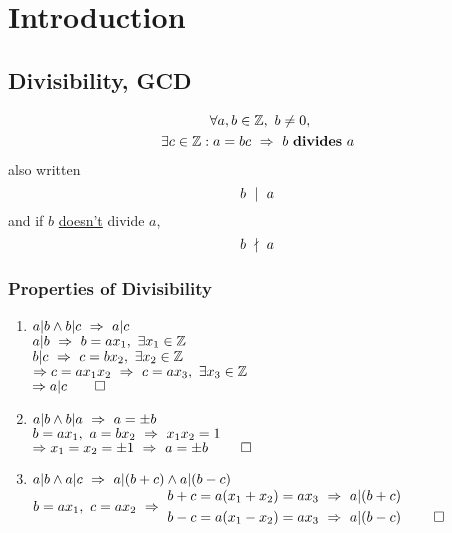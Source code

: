 \chapter{Introduction}
\section{Divisibility, GCD}
\begin{definition}[Divisibility]
  \begin{gather*}
    \forall a,b \in \mathbb{Z}, \ b \ne 0,	\\
    \exists c \in \mathbb{Z} : a=bc \ \Rightarrow \  b \ \textbf{divides} \ a \ 
  \end{gather*}
  also written \[b \ \mid \ a \ \]
  and if $b$ \underline{doesn't} divide $a$, \[b \ \nmid \ a \ \]
\end{definition}
\subsection{Properties of Divisibility}
\begin{enumerate}
  \item
        $a|b \wedge b|c \ \Rightarrow \  a|c \ $	\\
        $a|b \ \Rightarrow \  b=ax_1, \ \exists x_1 \in \mathbb{Z} \ $	\\
        $b|c \ \Rightarrow \  c=bx_2, \ \exists x_2 \in \mathbb{Z} \ $	\\
        $\Rightarrow \ifthen{c=ax_1x_2}{c=ax_3, \ \exists x_3 \in \Z}$	\\
        $\Rightarrow a|c \qed$
  \item
        $a|b \wedge b|a \ \Rightarrow \  a=\pm b \ $	\\
        $\ifthen{b=ax_1, \ a=bx_2}{x_1x_2=1}$	\\
        $\Rightarrow x_1=x_2=\pm 1 \ \Rightarrow \  a=\pm b \  \qed$
  \item
        $a|b \wedge a|c \ \Rightarrow \  a|(b+c) \wedge a|(b-c) \ $  \\
        $b=ax_1, \ c=ax_2 \ \Rightarrow \  
            \begin{aligned}
              b+c & = a(x_1+x_2) = ax_3 \ \Rightarrow \  a|(b+c) \       \\
              b-c & = a(x_1-x_2) = ax_3 \ \Rightarrow \  a|(b-c) \  \qed
            \end{aligned}
           \ $
\end{enumerate}
